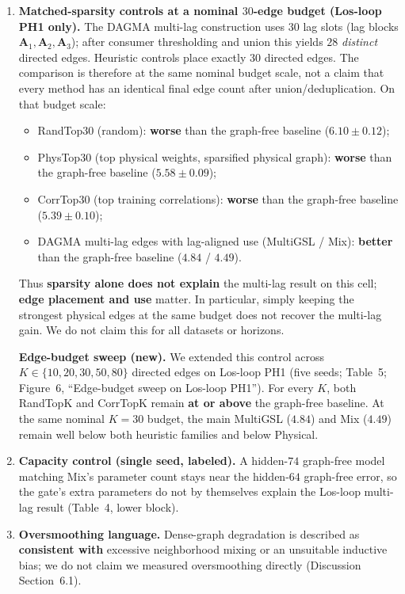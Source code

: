 \documentclass[a4paper,11pt]{article}
\begin{document}
{\begin{enumerate}
    \item \textbf{Matched-sparsity controls at a nominal $30$-edge budget (Los-loop PH1 only).}
    The DAGMA multi-lag construction uses $30$ lag slots (lag blocks $\mathbf{A}_1,\mathbf{A}_2,\mathbf{A}_3$); after consumer thresholding and union this yields $28$ \emph{distinct} directed edges. Heuristic controls place exactly $30$ directed edges. The comparison is therefore at the same nominal budget scale, not a claim that every method has an identical final edge count after union/deduplication. On that budget scale:
    \begin{itemize}
        \item RandTop30 (random): \textbf{worse} than the graph-free baseline ($6.10\pm 0.12$);
        \item PhysTop30 (top physical weights, sparsified physical graph): \textbf{worse} than the graph-free baseline ($5.58\pm 0.09$);
        \item CorrTop30 (top training correlations): \textbf{worse} than the graph-free baseline ($5.39\pm 0.10$);
        \item DAGMA multi-lag edges with lag-aligned use (MultiGSL / Mix): \textbf{better} than the graph-free baseline ($4.84$ / $4.49$).
    \end{itemize}
    Thus \textbf{sparsity alone does not explain} the multi-lag result on this cell; \textbf{edge placement and use} matter. In particular, simply keeping the strongest physical edges at the same budget does not recover the multi-lag gain. We do not claim this for all datasets or horizons.

    \textbf{Edge-budget sweep (new).} We extended this control across $K\in\{10,20,30,50,80\}$ directed edges on Los-loop PH1 (five seeds; Table~5; Figure~6, ``Edge-budget sweep on Los-loop PH1''). For every $K$, both RandTopK and CorrTopK remain \textbf{at or above} the graph-free baseline. At the same nominal $K=30$ budget, the main MultiGSL ($4.84$) and Mix ($4.49$) remain well below both heuristic families and below Physical.

    \item \textbf{Capacity control (single seed, labeled).}
    A hidden-$74$ graph-free model matching Mix's parameter count stays near the hidden-$64$ graph-free error, so the gate's extra parameters do not by themselves explain the Los-loop multi-lag result (Table~4, lower block).

    \item \textbf{Oversmoothing language.}
    Dense-graph degradation is described as \textbf{consistent with} excessive neighborhood mixing or an unsuitable inductive bias; we do not claim we measured oversmoothing directly (Discussion Section~6.1).
\end{enumerate}

}
\end{document}
